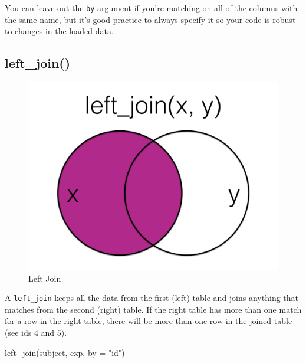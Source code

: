 \documentclass[
  oneside]{book}
\newenvironment{Shaded}{\begin{snugshade}}{\end{snugshade}}
\newcommand{\AttributeTok}[1]{\textcolor[rgb]{0.77,0.63,0.00}{#1}}
\newcommand{\FunctionTok}[1]{\textcolor[rgb]{0.00,0.00,0.00}{#1}}
\newcommand{\NormalTok}[1]{#1}
\newcommand{\StringTok}[1]{\textcolor[rgb]{0.31,0.60,0.02}{#1}}
\begin{document}
\begin{info}
You can leave out the \texttt{by} argument if you're matching on all of the columns with the same name, but it's good practice to always specify it so your code is robust to changes in the loaded data.

\end{info}

\hypertarget{left_join}{%
\subsection{left\_join()}\label{left_join}}

\begin{figure}

{\centering \includegraphics[width=1\linewidth]{images/joins/left_join} 

}

\caption{Left Join}\label{fig:img-left-join}
\end{figure}

A \texttt{left\_join} keeps all the data from the first (left) table and joins anything that matches from the second (right) table. If the right table has more than one match for a row in the right table, there will be more than one row in the joined table (see ids 4 and 5).

\begin{Shaded}
\begin{Highlighting}[]
\FunctionTok{left\_join}\NormalTok{(subject, exp, }\AttributeTok{by =} \StringTok{"id"}\NormalTok{)}
\end{Highlighting}
\end{Shaded}
\end{document}

